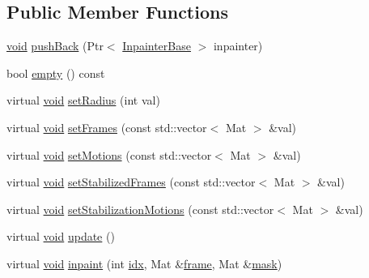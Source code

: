 \subsection*{Public Member Functions}
\begin{DoxyCompactItemize}
\item 
\hyperlink{legacy_8hpp_a8bb47f092d473522721002c86c13b94e}{void} \hyperlink{classcv_1_1videostab_1_1InpaintingPipeline_a81161c1f209a241259f22714334f0bd1}{push\-Back} (Ptr$<$ \hyperlink{classcv_1_1videostab_1_1InpainterBase}{Inpainter\-Base} $>$ inpainter)
\item 
bool \hyperlink{classcv_1_1videostab_1_1InpaintingPipeline_a616c66d103cd73e98a987c28e81038f6}{empty} () const 
\item 
virtual \hyperlink{legacy_8hpp_a8bb47f092d473522721002c86c13b94e}{void} \hyperlink{classcv_1_1videostab_1_1InpaintingPipeline_add4eb7a0b5f437182625554c02be100a}{set\-Radius} (int val)
\item 
virtual \hyperlink{legacy_8hpp_a8bb47f092d473522721002c86c13b94e}{void} \hyperlink{classcv_1_1videostab_1_1InpaintingPipeline_ace39edc315891bea316f38b0edcd452a}{set\-Frames} (const std\-::vector$<$ Mat $>$ \&val)
\item 
virtual \hyperlink{legacy_8hpp_a8bb47f092d473522721002c86c13b94e}{void} \hyperlink{classcv_1_1videostab_1_1InpaintingPipeline_a160c3280de21b06e28a3fe28367287c3}{set\-Motions} (const std\-::vector$<$ Mat $>$ \&val)
\item 
virtual \hyperlink{legacy_8hpp_a8bb47f092d473522721002c86c13b94e}{void} \hyperlink{classcv_1_1videostab_1_1InpaintingPipeline_a176535738bdb9e521518b604aef4d0cd}{set\-Stabilized\-Frames} (const std\-::vector$<$ Mat $>$ \&val)
\item 
virtual \hyperlink{legacy_8hpp_a8bb47f092d473522721002c86c13b94e}{void} \hyperlink{classcv_1_1videostab_1_1InpaintingPipeline_a9257bb136cdfe2db89e362d8c5a697b8}{set\-Stabilization\-Motions} (const std\-::vector$<$ Mat $>$ \&val)
\item 
virtual \hyperlink{legacy_8hpp_a8bb47f092d473522721002c86c13b94e}{void} \hyperlink{classcv_1_1videostab_1_1InpaintingPipeline_ab8d0f36e30af37565ae460475aeed918}{update} ()
\item 
virtual \hyperlink{legacy_8hpp_a8bb47f092d473522721002c86c13b94e}{void} \hyperlink{classcv_1_1videostab_1_1InpaintingPipeline_a1c44071cc26f46e6959641cb170e472c}{inpaint} (int \hyperlink{core__c_8h_a5c7c842f447336aa2f10826df65a28b3}{idx}, Mat \&\hyperlink{core__c_8h_a0430deaafd9043e478f306e33961299d}{frame}, Mat \&\hyperlink{tracking_8hpp_a6b13ecd2fd6ec7ad422f1d7863c3ad19}{mask})
\end{DoxyCompactItemize}
